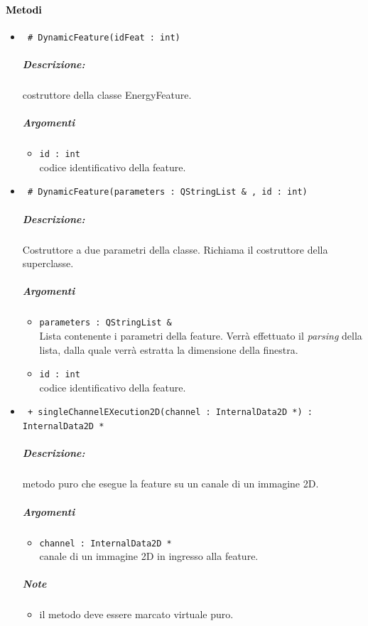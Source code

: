 \paragraph{\textcolor{black}{Metodi\\}}
	\begin{itemize}
	\item \color{blue}\verb! # DynamicFeature(idFeat : int)!
		\color{black}
		\subparagraph{Descrizione:} costruttore della classe EnergyFeature.
		\subparagraph{Argomenti}
			\begin{itemize}
				\item \color{RoyalPurple} \verb!id : int! \\ 
				\color{black} codice identificativo della feature\g{}.	
			\end{itemize}
			
	\item \color{blue}\verb! # DynamicFeature(parameters : QStringList & , id : int)!
		\color{black}
		\subparagraph{Descrizione:} Costruttore a due parametri della classe. Richiama il costruttore della 						superclasse.
		\subparagraph{Argomenti}
			\begin{itemize}	
				\item \color{RoyalPurple} \verb!parameters : QStringList &! \\ 
				\color{black} Lista contenente i parametri della feature\g{}. Verrà effettuato il \textit{parsing} 						della lista, dalla quale verrà estratta la dimensione della finestra.
				\item \color{RoyalPurple} \verb!id : int! \\ 
				\color{black} codice identificativo della feature\g{}.	
			\end{itemize}

	\item \color{blue}\verb! + singleChannelEXecution2D(channel : InternalData2D *) : InternalData2D *!
		\color{black}
		\subparagraph{Descrizione:} metodo puro che esegue la feature su un canale di un immagine 2D.
		\subparagraph{Argomenti}
			\begin{itemize}
				\item \color{RoyalPurple} \verb!channel : InternalData2D * ! \\ 
				\color{black} canale di un immagine 2D in ingresso alla feature.		
			\end{itemize}
		\subparagraph{Note}
			\begin{itemize}
				\item il metodo deve essere marcato virtuale puro.
			\end{itemize}
			

\end{itemize}
